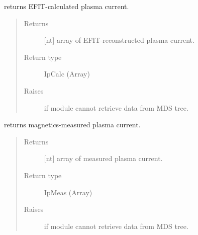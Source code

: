 \documentclass[letterpaper,10pt,english]{sphinxmanual}
\begin{document}
\begin{fulllineitems}

\begin{fulllineitems}
\label{\detokenize{eqtools:eqtools.TCVLIUQE.TCVLIUQETree.getIpCalc}}
returns EFIT-calculated plasma current.
\begin{quote}\begin{description}
\item[{Returns}] \leavevmode
{[}nt{]} array of EFIT-reconstructed plasma current.

\item[{Return type}] \leavevmode
IpCalc (Array)

\item[{Raises}] \leavevmode
{} \textendash{} if module cannot retrieve data from MDS tree.

\end{description}\end{quote}

\end{fulllineitems}


\begin{fulllineitems}
\label{\detokenize{eqtools:eqtools.TCVLIUQE.TCVLIUQETree.getIpMeas}}
returns magnetics-measured plasma current.
\begin{quote}\begin{description}
\item[{Returns}] \leavevmode
{[}nt{]} array of measured plasma current.

\item[{Return type}] \leavevmode
IpMeas (Array)

\item[{Raises}] \leavevmode
{} \textendash{} if module cannot retrieve data from MDS tree.

\end{description}\end{quote}

\end{fulllineitems}



\end{fulllineitems}
\end{document}
